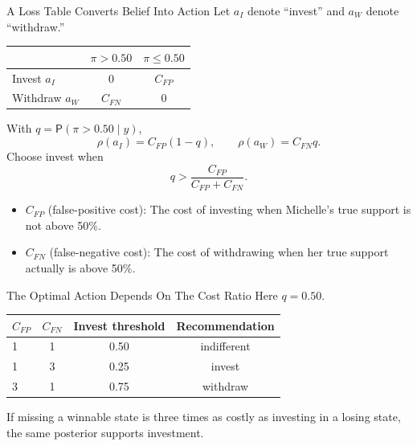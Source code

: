 \documentclass[aspectratio=43,11pt]{beamer}
\newcommand{\prob}{\mathsf{P}}
\begin{document}
{  %
  \begin{frame}{A Loss Table Converts Belief Into Action}
    Let $a_I$ denote ``invest'' and $a_W$ denote ``withdraw.''
    \begin{center}
      \begin{tabular}{lcc}
        \toprule
        & $\pi>0.50$ & $\pi\le0.50$\\
        \midrule
        Invest $a_I$ & $0$ & $C_{FP}$\\
        Withdraw $a_W$ & $C_{FN}$ & $0$\\
        \bottomrule
      \end{tabular}
    \end{center}
    With $q=\prob(\pi>0.50\mid y)$,
    \[
    \rho(a_I)=C_{FP}(1-q),\qquad \rho(a_W)=C_{FN}q.
    \]
    Choose invest when
    \[
    \boxed{q>\frac{C_{FP}}{C_{FP}+C_{FN}}}.
    \]

    \tiny
    \begin{itemize}
      \item $C_{FP}$ (false-positive cost): The cost of investing when Michelle’s true support is not above 50\%.
      \item $C_{FN}$ (false-negative cost): The cost of withdrawing when her true support actually is above 50\%.
    \end{itemize}
  \end{frame}

  \begin{frame}{The Optimal Action Depends On The Cost Ratio}
    Here $q=0.50$.
    \begin{center}
      \begin{tabular}{lccc}
        \toprule
        $C_{FP}$ & $C_{FN}$ & Invest threshold & Recommendation\\
        \midrule
        1 & 1 & 0.50 & indifferent\\
        1 & 3 & 0.25 & invest\\
        3 & 1 & 0.75 & withdraw\\
        \bottomrule
      \end{tabular}
    \end{center}
    \begin{block}{}
      If missing a winnable state is three times as costly as investing in a losing state, the same posterior supports investment.
    \end{block}
  \end{frame}

}
\end{document}

